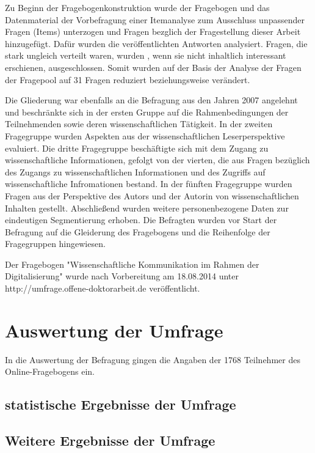 Zu Beginn der Fragebogenkonstruktion wurde der Fragebogen und das Datenmaterial der Vorbefragung einer Itemanalyse zum Ausschluss unpassender Fragen (Items) unterzogen und Fragen bezglich der Fragestellung dieser Arbeit hinzugefügt. Dafür wurden die veröffentlichten Antworten analysiert. Fragen, die stark ungleich verteilt waren, wurden , wenn sie nicht inhaltlich interessant erschienen, ausgeschlossen.  Somit wurden auf der Basis der Analyse der Fragen der Fragepool auf 31 Fragen reduziert beziehungsweise verändert.

Die Gliederung war ebenfalls an die Befragung aus den Jahren 2007 angelehnt und beschränkte sich in der ersten Gruppe auf die Rahmenbedingungen der Teilnehmenden sowie deren wissenschaftlichen Tätigkeit. In der zweiten Fragegruppe wurden Aspekten aus der wissenschaftlichen Leserperspektive evaluiert. Die dritte Fragegruppe beschäftigte sich mit dem Zugang zu wissenschaftliche Informationen, gefolgt von der vierten, die aus Fragen bezüglich des Zugangs zu wissenschaftlichen Informationen und des Zugriffs auf wissenschaftliche Infromationen bestand. In der fünften Fragegruppe wurden Fragen aus der Perspektive des Autors und der Autorin von wissenschaftlichen Inhalten gestellt. Abschließend wurden weitere personenbezogene Daten zur eindeutigen Segmentierung erhoben. Die Befragten wurden vor Start der Befragung auf die Gleiderung des Fragebogens und die Reihenfolge der Fragegruppen hingewiesen.

Der Fragebogen "Wissenschaftliche Kommunikation im Rahmen der Digitalisierung" wurde nach Vorbereitung am 18.08.2014 unter http://umfrage.offene-doktorarbeit.de veröffentlicht.

\section{Auswertung der Umfrage}

In die Auswertung der Befragung gingen die Angaben der 1768 Teilnehmer des Online-Fragebogens ein.


\subsection{statistische Ergebnisse der Umfrage}



\subsection{Weitere Ergebnisse der Umfrage}

